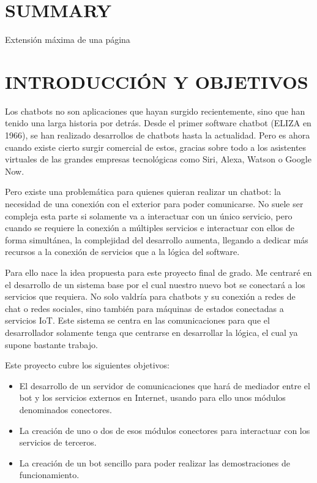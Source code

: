 \documentclass[spanish,12pt, a4paper, twoside]{paper}
\let\oldsection\section
\def\section{\cleardoublepage\oldsection}
\begin{document}
\section*{SUMMARY}
Extensión máxima de una página

\tableofcontents %

\listoffigures
\listoftables

\newpage
{} 

\section{INTRODUCCIÓN Y OBJETIVOS}

Los chatbots no son aplicaciones que hayan surgido recientemente, sino que han tenido una larga historia por detrás. Desde el primer software chatbot (ELIZA en 1966), se han realizado desarrollos de chatbots hasta la actualidad. Pero es ahora cuando existe cierto surgir comercial de estos, gracias sobre todo a los asistentes virtuales de las grandes empresas tecnológicas como Siri, Alexa, Watson o Google Now.
\newline

Pero existe una problemática para quienes quieran realizar un chatbot: la necesidad de una conexión con el exterior para poder comunicarse. No suele ser compleja esta parte si solamente va a interactuar con un único servicio, pero cuando se requiere la conexión a múltiples servicios e interactuar con ellos de forma simultánea, la complejidad del desarrollo aumenta, llegando a dedicar más recursos a la conexión de servicios que a la lógica del software.
\newline

Para ello nace la idea propuesta para este proyecto final de grado. Me centraré en el desarrollo de un sistema base por el cual nuestro nuevo bot se conectará a los servicios que requiera. No solo valdría para chatbots y su conexión a redes de chat o redes sociales, sino también para máquinas de estados conectadas a servicios IoT. Este sistema se centra en las comunicaciones para que el desarrollador solamente tenga que centrarse en desarrollar la lógica, el cual ya supone bastante trabajo.
\newline

Este proyecto cubre los siguientes objetivos:

\begin{itemize}
\item El desarrollo de un servidor de comunicaciones que hará de mediador entre el bot y los servicios externos en Internet, usando para ello unos módulos denominados conectores.
\item La creación de uno o dos de esos módulos conectores para interactuar con los servicios de terceros.
\item La creación de un bot sencillo para poder realizar las demostraciones de funcionamiento.
\end{itemize}
\end{document}
